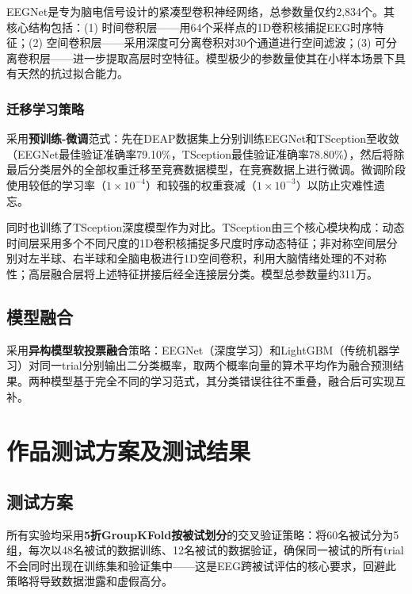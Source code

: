 \documentclass[UTF8,zihao=-4,fontset=fandol]{ctexart}
\numberwithin{equation}{section}
\numberwithin{figure}{section}
\numberwithin{table}{section}
\begin{document}
EEGNet\cite{eegnet}是专为脑电信号设计的紧凑型卷积神经网络，总参数量仅约2,834个。其核心结构包括：(1) 时间卷积层——用64个采样点的1D卷积核捕捉EEG时序特征；(2) 空间卷积层——采用深度可分离卷积对30个通道进行空间滤波；(3) 可分离卷积层——进一步提取高层时空特征。模型极少的参数量使其在小样本场景下具有天然的抗过拟合能力。

\subsubsection{迁移学习策略}

采用\textbf{预训练-微调}范式：先在DEAP数据集上分别训练EEGNet和TSception至收敛（EEGNet最佳验证准确率79.10\%，TSception最佳验证准确率78.80\%），然后将除最后分类层外的全部权重迁移至竞赛数据模型，在竞赛数据上进行微调。微调阶段使用较低的学习率（$1\times10^{-4}$）和较强的权重衰减（$1\times10^{-3}$）以防止灾难性遗忘。

同时也训练了TSception深度模型作为对比。TSception由三个核心模块构成：动态时间层采用多个不同尺度的1D卷积核捕捉多尺度时序动态特征；非对称空间层分别对左半球、右半球和全脑电极进行1D空间卷积，利用大脑情绪处理的不对称性；高层融合层将上述特征拼接后经全连接层分类。模型总参数量约311万。

\subsection{模型融合}

采用\textbf{异构模型软投票融合}策略：EEGNet（深度学习）和LightGBM（传统机器学习）对同一trial分别输出二分类概率，取两个概率向量的算术平均作为融合预测结果。两种模型基于完全不同的学习范式，其分类错误往往不重叠，融合后可实现互补。

\section{作品测试方案及测试结果}

\subsection{测试方案}

所有实验均采用\textbf{5折GroupKFold按被试划分}的交叉验证策略：将60名被试分为5组，每次以48名被试的数据训练、12名被试的数据验证，确保同一被试的所有trial不会同时出现在训练集和验证集中——这是EEG跨被试评估的核心要求，回避此策略将导致数据泄露和虚假高分。
\end{document}
